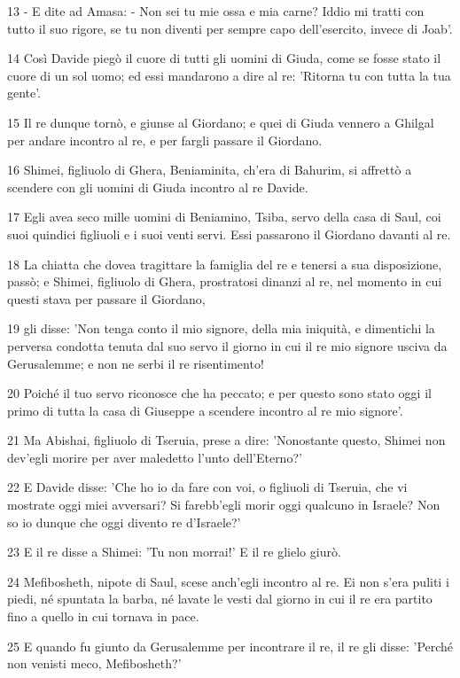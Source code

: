 \par 13 - E dite ad Amasa: - Non sei tu mie ossa e mia carne? Iddio mi tratti con tutto il suo rigore, se tu non diventi per sempre capo dell'esercito, invece di Joab'.
\par 14 Così Davide piegò il cuore di tutti gli uomini di Giuda, come se fosse stato il cuore di un sol uomo; ed essi mandarono a dire al re: 'Ritorna tu con tutta la tua gente'.
\par 15 Il re dunque tornò, e giunse al Giordano; e quei di Giuda vennero a Ghilgal per andare incontro al re, e per fargli passare il Giordano.
\par 16 Shimei, figliuolo di Ghera, Beniaminita, ch'era di Bahurim, si affrettò a scendere con gli uomini di Giuda incontro al re Davide.
\par 17 Egli avea seco mille uomini di Beniamino, Tsiba, servo della casa di Saul, coi suoi quindici figliuoli e i suoi venti servi. Essi passarono il Giordano davanti al re.
\par 18 La chiatta che dovea tragittare la famiglia del re e tenersi a sua disposizione, passò; e Shimei, figliuolo di Ghera, prostratosi dinanzi al re, nel momento in cui questi stava per passare il Giordano,
\par 19 gli disse: 'Non tenga conto il mio signore, della mia iniquità, e dimentichi la perversa condotta tenuta dal suo servo il giorno in cui il re mio signore usciva da Gerusalemme; e non ne serbi il re risentimento!
\par 20 Poiché il tuo servo riconosce che ha peccato; e per questo sono stato oggi il primo di tutta la casa di Giuseppe a scendere incontro al re mio signore'.
\par 21 Ma Abishai, figliuolo di Tseruia, prese a dire: 'Nonostante questo, Shimei non dev'egli morire per aver maledetto l'unto dell'Eterno?'
\par 22 E Davide disse: 'Che ho io da fare con voi, o figliuoli di Tseruia, che vi mostrate oggi miei avversari? Si farebb'egli morir oggi qualcuno in Israele? Non so io dunque che oggi divento re d'Israele?'
\par 23 E il re disse a Shimei: 'Tu non morrai!' E il re glielo giurò.
\par 24 Mefibosheth, nipote di Saul, scese anch'egli incontro al re. Ei non s'era puliti i piedi, né spuntata la barba, né lavate le vesti dal giorno in cui il re era partito fino a quello in cui tornava in pace.
\par 25 E quando fu giunto da Gerusalemme per incontrare il re, il re gli disse: 'Perché non venisti meco, Mefibosheth?'
